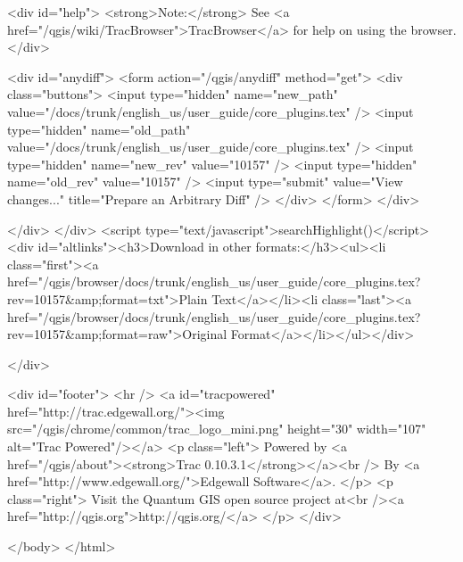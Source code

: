  <div id="help">
  <strong>Note:</strong> See <a href="/qgis/wiki/TracBrowser">TracBrowser</a> for help on using the browser.
 </div>

  <div id="anydiff">
   <form action="/qgis/anydiff" method="get">
    <div class="buttons">
     <input type="hidden" name="new_path" value="/docs/trunk/english_us/user_guide/core_plugins.tex" />
     <input type="hidden" name="old_path" value="/docs/trunk/english_us/user_guide/core_plugins.tex" />
     <input type="hidden" name="new_rev" value="10157" />
     <input type="hidden" name="old_rev" value="10157" />
     <input type="submit" value="View changes..." title="Prepare an Arbitrary Diff" />
    </div>
   </form>
  </div>

</div>
</div>
<script type="text/javascript">searchHighlight()</script>
<div id="altlinks"><h3>Download in other formats:</h3><ul><li class="first"><a href="/qgis/browser/docs/trunk/english_us/user_guide/core_plugins.tex?rev=10157&amp;format=txt">Plain Text</a></li><li class="last"><a href="/qgis/browser/docs/trunk/english_us/user_guide/core_plugins.tex?rev=10157&amp;format=raw">Original Format</a></li></ul></div>

</div>

<div id="footer">
 <hr />
 <a id="tracpowered" href="http://trac.edgewall.org/"><img src="/qgis/chrome/common/trac_logo_mini.png" height="30" width="107"
   alt="Trac Powered"/></a>
 <p class="left">
  Powered by <a href="/qgis/about"><strong>Trac 0.10.3.1</strong></a><br />
  By <a href="http://www.edgewall.org/">Edgewall Software</a>.
 </p>
 <p class="right">
  Visit the Quantum GIS open source project at<br /><a href="http://qgis.org">http://qgis.org/</a>
 </p>
</div>



 </body>
</html>

